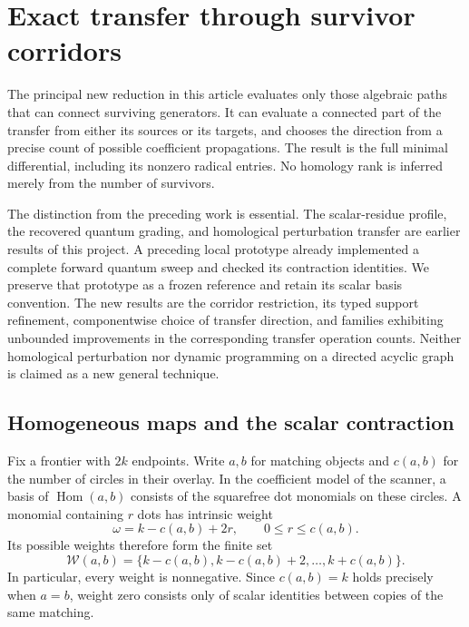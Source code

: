 \section{Exact transfer through survivor corridors}
\label{sec:survivor-corridors}

The principal new reduction in this article evaluates only those algebraic
paths that can connect surviving generators.  It can evaluate a connected
part of the transfer from either its sources or its targets, and chooses the
direction from a precise count of possible coefficient propagations.  The
result is the full minimal differential, including its nonzero radical
entries.  No homology rank is inferred merely from the number of survivors.

The distinction from the preceding work is essential.  The scalar-residue
profile, the recovered quantum grading, and homological perturbation transfer
are earlier results of this project.  A preceding local prototype already
implemented a complete forward quantum sweep and checked its contraction
identities.  We preserve that prototype as a frozen reference and retain its
scalar basis convention.  The new results are the corridor restriction, its
typed support refinement, componentwise choice of transfer direction, and
families exhibiting unbounded improvements in the corresponding transfer
operation counts.  Neither homological perturbation nor dynamic programming
on a directed acyclic graph is claimed as a new general technique.

\subsection{Homogeneous maps and the scalar contraction}

Fix a frontier with $2k$ endpoints.  Write $a,b$ for matching objects and
$c(a,b)$ for the number of circles in their overlay.  In the coefficient model
of the scanner, a basis of $\operatorname{Hom}(a,b)$ consists of the squarefree
dot monomials on these circles.  A monomial containing $r$ dots has intrinsic
weight
\begin{equation}\label{eq:corridor-intrinsic-weight}
  \omega=k-c(a,b)+2r,\qquad 0\le r\le c(a,b).
\end{equation}
Its possible weights therefore form the finite set
\begin{equation}\label{eq:corridor-weight-set}
  \mathcal W(a,b)=
  \{k-c(a,b),k-c(a,b)+2,\ldots,k+c(a,b)\}.
\end{equation}
In particular, every weight is nonnegative.  Since $c(a,b)=k$ holds precisely
when $a=b$, weight zero consists only of scalar identities between copies of
the same matching.

